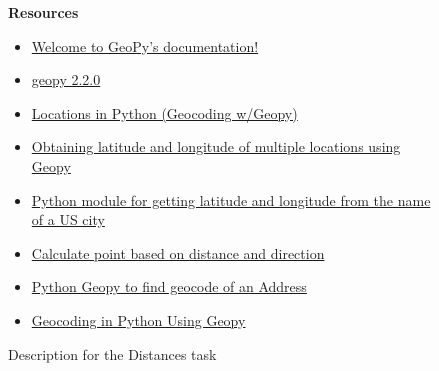 \begin{figure}
\begin{mdframed}[backgroundcolor=gray!05]
\begin{scriptsize}
\textbf{Resources}

\begin{itemize}
    \item  \href{https://geopy.readthedocs.io/en/stable/}{Welcome to GeoPy's documentation!}
    \item  \href{https://geopy.readthedocs.io/en/release-2.2.0/index.html}{geopy 2.2.0}
    \item \href{https://holypython.com/locations-in-python-geocoding-w-geopy/}{Locations in Python (Geocoding w/Geopy)}
    \item \href{https://stackoverflow.com/questions/37608811/obtaining-latitude-and-longitude-of-multiple-locations-using-geopy}{Obtaining latitude and longitude of multiple locations using Geopy}
    \item \href{https://stackoverflow.com/questions/13686001/python-module-for-getting-latitude-and-longitude-from-the-name-of-a-us-city}{Python module for getting latitude and longitude from the name of a US city}
    \item  \href{https://stackoverflow.com/questions/24427828/calculate-point-based-on-distance-and-direction}{Calculate point based on distance and direction}
    \item  \href{https://www.askpython.com/python/python-geopy-to-find-geocode-of-an-address}{Python Geopy to find geocode of an Address}
    \item  \href{https://pythonsimplified.com/geocoding-in-python-using-geopy/}{Geocoding in Python Using Geopy}
\end{itemize}

\end{scriptsize}
\end{mdframed}
\caption{Description for the Distances task}
\end{figure}

    